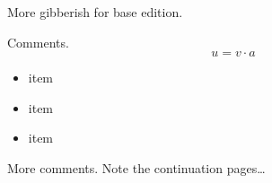 \documentclass{book}
\begin{document}
More gibberish for base edition.

\lipsum[15-17]

\begin{commeditComments}
  Comments.
  \kant[4]
  \begin{equation}
    u=v\cdot a
  \end{equation}
\end{commeditComments}

\lipsum[3-2]

\begin{commeditComments}
  \begin{itemize}
  \item item
  \item item
  \item item
  \end{itemize}

  
  \pagebreak
  More comments.  Note the continuation pages\ldots
  \kant[8-20]
\end{commeditComments}

\lipsum[9-20]
\end{document}
